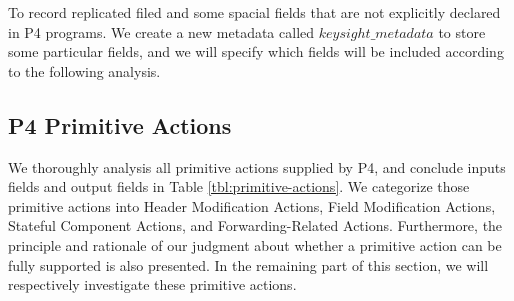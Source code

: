 \documentclass[sigconf]{acmart}
\begin{document}
To record replicated filed and some spacial fields that are not explicitly declared in P4 programs. We create a new metadata called $keysight\_metadata$ to store some particular fields, and we will specify which fields will be included according to the following analysis.




\subsection{P4 Primitive Actions}
We thoroughly analysis all primitive actions supplied by P4, and conclude inputs fields and output fields in Table \ref{tbl:primitive-actions}. We categorize those primitive actions into Header Modification Actions, Field Modification Actions, Stateful Component Actions, and Forwarding-Related Actions. Furthermore, the principle and rationale of our judgment about whether a primitive action can be fully supported is also presented. In the remaining part of this section, we will respectively investigate these primitive actions. 
\end{document}
